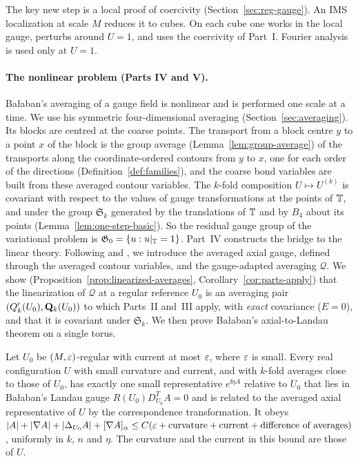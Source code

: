 The key new step is a local proof of coercivity (Section~\ref{sec:reg-gauge}). An IMS localization at scale $M$ reduces it to cubes. On each cube one works in the local gauge, perturbs around $U=1$, and uses the coercivity of Part~I. Fourier analysis is used only at $U=1$.

\paragraph{The nonlinear problem (Parts IV and V).} Ba\l aban's averaging of a gauge field is nonlinear and is performed one scale at a time. We use his symmetric four-dimensional averaging \cite[(0.3)--(0.12)]{BalYM4I} (Section~\ref{sec:averaging}). Its blocks are centred at the coarse points. The transport from a block centre $y$ to a point $x$ of the block is the group average (Lemma~\ref{lem:group-average}) of the transports along the coordinate-ordered contours from $y$ to $x$, one for each order of the directions (Definition~\ref{def:families}), and the coarse bond variables are built from these averaged contour variables. The $k$-fold composition $U\mapsto U^{(k)}$ is covariant with respect to the values of gauge transformations at the points of $\mathbb T$, and under the group $\mathfrak S_k$ generated by the translations of $\mathbb T$ and by $B_4$ about its points (Lemma~\ref{lem:one-step-basic}). So the residual gauge group of the variational problem is $\mathfrak G_0=\{u:u|_\mathbb T=1\}$. Part~IV constructs the bridge to the linear theory. Following \cite{BalAvg,BalReg} and \cite[pp.~253--254]{BalYM4I}, we introduce the averaged axial gauge, defined through the averaged contour variables, and the gauge-adapted averaging $\mathcal Q$. We show (Proposition~\ref{prop:linearized-averages}, Corollary~\ref{cor:parts-apply}) that the linearization of $\mathcal Q$ at a regular reference $U_0$ is an averaging pair $(Q'_k(U_0),\mathbf Q_k(U_0))$ to which Parts~II and~III apply, with \emph{exact} covariance ($E=0$), and that it is covariant under $\mathfrak S_k$. We then prove Ba\l aban's axial-to-Landau theorem \cite[Theorem~2]{BalReg} on a single torus.

\begin{maintheorem}\label{thm:H}
Let $U_0$ be $(M,\varepsilon)$-regular with current at most $\varepsilon$, where $\varepsilon$ is small. Every real configuration $U$ with small curvature and current, and with $k$-fold averages close to those of $U_0$, has exactly one small representative $e^{\ii\eta A}$ relative to $U_0$ that lies in Ba\l aban's Landau gauge $R(U_0)D^T_{U_0}A=0$ and is related to the averaged axial representative of $U$ by the correspondence transformation. It obeys $|A|+|\nabla A|+|\Delta_{U_0}A|+[\nabla A]_\alpha\le C(\varepsilon+\text{curvature}+\text{current}+\text{difference of averages})$, uniformly in $k$, $n$ and $\eta$. The curvature and the current in this bound are those of $U$.
\end{maintheorem}

